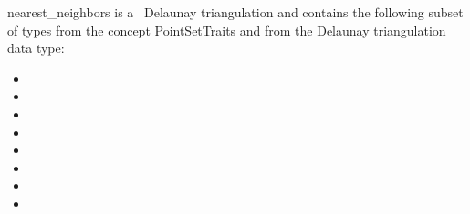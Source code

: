 \begin{ccRefFunction}{nearest_neighbors}
 is a \cgal\ Delaunay triangulation and contains the following subset of types from the concept PointSetTraits and from
the Delaunay triangulation data type:
\begin{itemize}
  \item {}             
  \item {}                
  \item {}               
  \item {}            
  \item {}                                   
  \item {}                       
  \item {}                           
  \item {}    
\end{itemize}  
\end{ccRefFunction}
